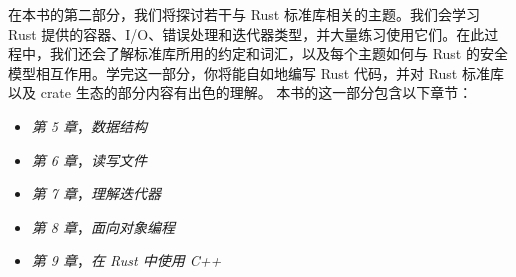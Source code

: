 在本书的第二部分，我们将探讨若干与 Rust 标准库相关的主题。我们会学习 Rust 提供的容器、I/\allowbreak{}O、错误处理和迭代器类型，并大量练习使用它们。在此过程中，我们还会了解标准库所用的约定和词汇，以及每个主题如何与 Rust 的安全模型相互作用。学完这一部分，你将能自如地编写 Rust 代码，并对 Rust 标准库以及 crate 生态的部分内容有出色的理解。
本书的这一部分包含以下章节：
\begin{itemize}
  \item \emph{第 5 章}，\emph{数据结构}
  \item \emph{第 6 章}，\emph{读写文件}
  \item \emph{第 7 章}，\emph{理解迭代器}
  \item \emph{第 8 章}，\emph{面向对象编程}
  \item \emph{第 9 章}，\emph{在 Rust 中使用 C++}
\end{itemize}  

